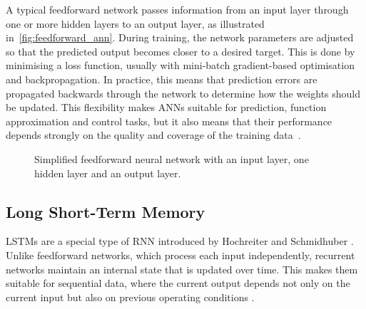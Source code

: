 A typical feedforward network passes information from an input layer through one or more hidden layers to an output layer, as illustrated in~\autoref{fig:feedforward_ann}. During training, the network parameters are adjusted so that the predicted output becomes closer to a desired target. This is done by minimising a loss function, usually with mini-batch gradient-based optimisation and backpropagation. In practice, this means that prediction errors are propagated backwards through the network to determine how the weights should be updated. This flexibility makes \acp{ANN} suitable for prediction, function approximation and control tasks, but it also means that their performance depends strongly on the quality and coverage of the training data~\cite{goodfellow_deep_2016}.

\begin{figure}[htbp]
  \centering
  \caption[Feedforward neural network]{Simplified feedforward neural network with an input layer, one hidden layer and an output layer.}
  \label{fig:feedforward_ann}
\end{figure}

\subsection{Long Short-Term Memory}
\label{subsec:lstm_theory}
\acp{LSTM} are a special type of \ac{RNN} introduced by Hochreiter and Schmidhuber \cite{hochreiter_long_1997}. Unlike feedforward networks, which process each input independently, recurrent networks maintain an internal state that is updated over time. This makes them suitable for sequential data, where the current output depends not only on the current input but also on previous operating conditions \cite{goodfellow_deep_2016}.


